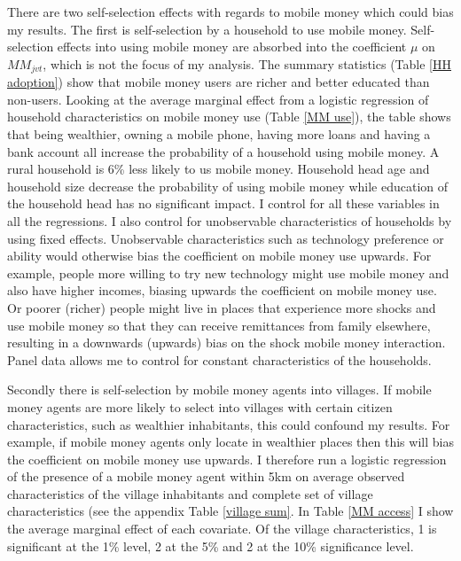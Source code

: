 There are two self-selection effects with regards to mobile money which could bias my results. The first is self-selection by a household to use mobile money. Self-selection effects into using mobile money are absorbed into the coefficient $\mu$ on $MM_{jvt}$, which is not the focus of my analysis. The summary statistics (Table \ref{HH adoption}) show that mobile money users are richer and better educated than non-users. Looking at the average marginal effect from a logistic regression of household characteristics on mobile money use (Table \ref{MM use}), the table shows that being wealthier, owning a mobile phone, having more loans and having a bank account all increase the probability of a household using mobile money. A rural household is 6\% less likely to us mobile money. Household head age and household size decrease the probability of using mobile money while education of the household head has no significant impact. I control for all these variables in all the regressions. I also control for unobservable characteristics of households by using fixed effects. Unobservable characteristics such as technology preference or ability would otherwise bias the coefficient on mobile money use upwards. For example, people more willing to try new technology might use mobile money and also have higher incomes, biasing upwards the coefficient on mobile money use. Or poorer (richer) people might live in places that experience more shocks and use mobile money so that they can receive remittances from family elsewhere, resulting in a downwards (upwards) bias on the shock mobile money interaction. Panel data allows me to control for constant characteristics of the households.  




Secondly there is self-selection by mobile money agents into villages. If mobile money agents are more likely to select into villages with certain citizen characteristics, such as wealthier inhabitants, this could confound my results. For example, if mobile money agents only locate in wealthier places then this will bias the coefficient on mobile money use upwards. I therefore run a logistic regression of the presence of a mobile money agent within 5km on average observed characteristics of the village inhabitants and complete set of village characteristics (see the appendix Table \ref{village sum}. In Table \ref{MM access} I show the average marginal effect of each covariate. Of the village characteristics, 1 is significant at the 1\% level, 2 at the 5\% and 2 at the 10\% significance level. 

